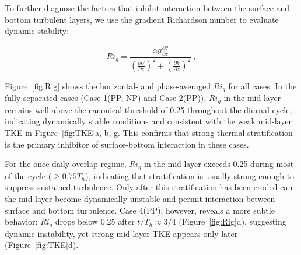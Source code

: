 \documentclass[draft]{agujournal2019}
\begin{document}
To further diagnose the factors that inhibit interaction between the surface and bottom turbulent layers, we use the gradient Richardson number to evaluate dynamic stability:
\begin{linenomath*}
\begin{equation}
Ri_g=\frac{\alpha g\frac{\partial \theta}{\partial z}}{(\frac{\partial U}{\partial z})^{2}+(\frac{\partial V}{\partial z})^2}\ ,
\label{eq:RichardsonNumber}
\end{equation}
\end{linenomath*}
Figure~\ref{fig:Rig} shows the horizontal- and phase-averaged $Ri_g$ for all cases. In the fully separated cases (Case 1(PP, NP) and Case 2(PP)), $Ri_g$ in the mid-layer remains well above the canonical threshold of 0.25 throughout the diurnal cycle, indicating dynamically stable conditions and consistent with the weak mid-layer TKE in Figure~\ref{fig:TKE}a, b, g. This confirms that strong thermal stratification is the primary inhibitor of surface-bottom interaction in these cases.

For the once-daily overlap regime, $Ri_g$ in the mid-layer exceeds 0.25 during most of the cycle ($\ge0.75T_h$), indicating that stratification is usually strong enough to suppress sustained turbulence. Only after this stratification has been eroded can the mid-layer become dynamically unstable and permit interaction between surface and bottom turbulence. Case 4(PP), however, reveals a more subtle behavior: $Ri_g$ drops below 0.25 after $t/T_h \approx 3/4$ (Figure~\ref{fig:Rig}d), suggesting dynamic instability, yet strong mid-layer TKE appears only later (Figure~\ref{fig:TKE}d). 
\end{document}
